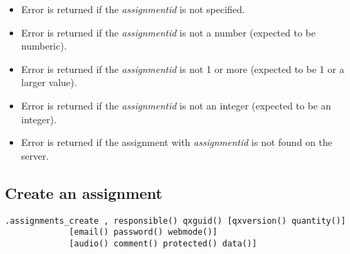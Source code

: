 \errheader
\begin{itemize}
    \item Error  is returned if the \textit{assignmentid} is not specified.
    \item Error  is returned if the \textit{assignmentid} is not a number (expected to be numberic).
    \item Error  is returned if the \textit{assignmentid} is not 1 or more (expected to be 1 or a larger value).
    \item Error  is returned if the \textit{assignmentid} is not an integer (expected to be an integer).
    \item Error  is returned if the assignment with \textit{assignmentid} is not found on the server.
\end{itemize}


\subsection{Create an assignment}

\begin{lstlisting}[style=CommandLineStyle]
.assignments_create , responsible() qxguid() [qxversion() quantity()]
             [email() password() webmode()]
             [audio() comment() protected() data()]
\end{lstlisting}

